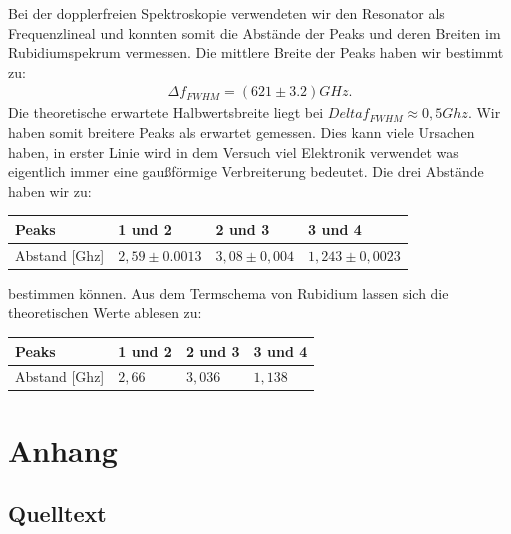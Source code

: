 \documentclass[12pt]{article}
\begin{document}
Bei der dopplerfreien Spektroskopie verwendeten wir den Resonator als Frequenzlineal und konnten somit die Abstände der Peaks und deren Breiten im Rubidiumspekrum vermessen.
Die mittlere Breite der Peaks haben wir bestimmt zu:
\begin{align*}
 \Delta f_{FWHM} = (621 \pm 3.2) GHz.
\end{align*}
Die theoretische erwartete Halbwertsbreite liegt bei $Delta f_{FWHM} \approx 0,5 Ghz$. Wir haben somit breitere Peaks als erwartet gemessen. Dies kann viele Ursachen haben, in erster Linie wird in dem Versuch viel Elektronik verwendet was eigentlich immer eine gaußförmige Verbreiterung bedeutet.
Die drei Abstände haben wir zu:
\begin{table}[H]
\begin{center}
\begin{tabular}{|l|l|l|l|}
\hline
Peaks & 1 und 2 & 2 und 3 & 3 und 4\\
\hline
Abstand [Ghz] & $2,59 \pm 0.0013$ & $3,08 \pm 0,004$ & $1,243 \pm 0,0023$\\
\hline
\end{tabular}
\end{center}
\end{table}
bestimmen können.
Aus dem Termschema von Rubidium lassen sich die theoretischen Werte ablesen zu:
\begin{table}[H]
\begin{center}
\begin{tabular}{|l|l|l|l|}
\hline
Peaks & 1 und 2 & 2 und 3 & 3 und 4\\
\hline
Abstand [Ghz] & $2,66$ & $3,036$ & $1,138$\\
\hline
\end{tabular}
\end{center}
\end{table}

\section{Anhang}


\subsection{Quelltext}

%
\end{document}
